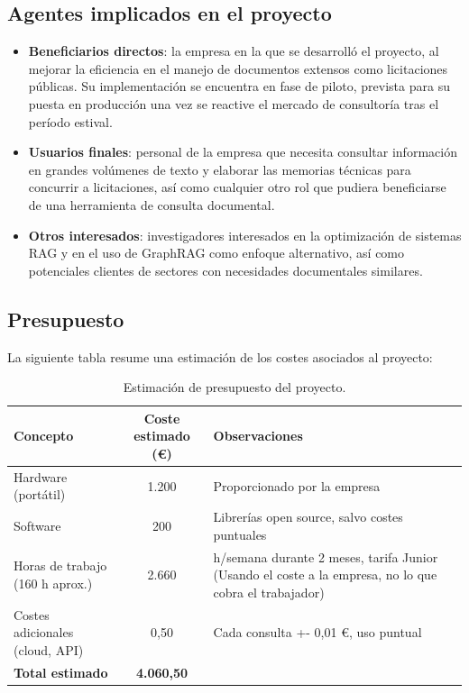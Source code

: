 \subsection{Agentes implicados en el proyecto}
\begin{itemize}
    \item \textbf{Beneficiarios directos}: la empresa en la que se desarrolló el proyecto, al mejorar la eficiencia en el manejo de documentos extensos como licitaciones públicas. Su implementación se encuentra en fase de piloto, prevista para su puesta en producción una vez se reactive el mercado de consultoría tras el período estival.
    \item \textbf{Usuarios finales}: personal de la empresa que necesita consultar información en grandes volúmenes de texto y elaborar las memorias técnicas para concurrir a licitaciones, así como cualquier otro rol que pudiera beneficiarse de una herramienta de consulta documental.
    \item \textbf{Otros interesados}: investigadores interesados en la optimización de sistemas RAG y en el uso de GraphRAG como enfoque alternativo, así como potenciales clientes de sectores con necesidades documentales similares.
\end{itemize}

\subsection{Presupuesto}
La siguiente tabla resume una estimación de los costes asociados al proyecto:

\begin{table}[H]
\centering
\small
\begin{tabularx}{\textwidth}{|l|c|>{\raggedright\arraybackslash}X|}
\hline
\textbf{Concepto} & \textbf{Coste estimado (€)} & \textbf{Observaciones} \\ \hline
Hardware (portátil) & 1.200 & Proporcionado por la empresa \\ \hline
Software & 200 & Librerías open source, salvo costes puntuales \\ \hline
Horas de trabajo (160 h aprox.) & 2.660 & 20 h/semana durante 2 meses, tarifa Junior (Usando el coste a la empresa, no lo que cobra el trabajador) \\ \hline
Costes adicionales (cloud, API) & 0,50 & Cada consulta +- 0,01 €, uso puntual \\ \hline
\textbf{Total estimado} & \textbf{4.060,50} &  \\ \hline
\end{tabularx}
\caption{Estimación de presupuesto del proyecto.}
\label{tab:presupuesto}
\end{table}

